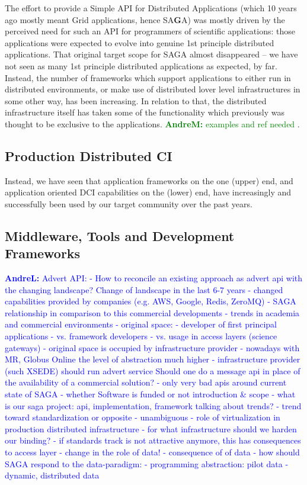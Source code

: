 \documentclass{article}
\newcommand{\B}[1]{\textbf{#1}}
\newcommand{\amnote}[1]{{\textcolor{green}{   \B{AndreM:  } #1 }}}
\newcommand{\alnote}[1]{{\textcolor{blue}{    \B{AndreL:  } #1 }}}
\newcommand{\amnote}[1]{}
\newcommand{\alnote}[1]{}
\begin{document}
  The effort to provide a Simple API for Distributed Applications
  (which 10 years ago mostly meant Grid applications, hence SA\B{G}A)
  was mostly driven by the perceived need for such an API for
  programmers of scientific applications: those applications were
  expected to evolve into genuine 1st principle distributed
  applications.  That original target scope for SAGA almost
  disappeared -- we have not seen as many 1st principle distributed
  applications as expected, by far.  Instead, the number of frameworks
  which support applications to either run in distributed
  environments, or make use of distributed lover level infrastructures
  in some other way, has been increasing.  In relation to that, the
  distributed infrastructure itself has taken some of the
  functionality which previously was thought to be exclusive to
  the applications. \amnote{examples and ref needed}.


 \subsection{Production Distributed CI}

  Instead, we have seen that application frameworks on the one (upper)
  end, and application oriented DCI capabilities on the (lower) end,
  have increasingly and successfully been used by our target community
  over the past years.


 \subsection{Middleware, Tools and Development Frameworks}


\alnote{Advert API: - How to reconcile an existing approach as advert
  api with the changing landscape?  Change of landscape in the last
  6-7 years - changed capabilities provided by companies (e.g. AWS,
  Google, Redis, ZeroMQ) - SAGA relationship in comparison to this
  commercial developments - trends in academia and commercial
  environments - original space: - developer of first principal
  applications - vs. framework developers - vs. usage in access layers
  (science gateways) - original space is occupied by infrastructure
  provider - nowadays with MR, Globus Online the level of abstraction
  much higher - infrastructure provider (such XSEDE) should run advert
  service Should one do a message api in place of the availability of
  a commercial solution?  - only very bad apis around current state of
  SAGA - whether Software is funded or not introduction \& scope -
  what is our saga project: api, implementation, framework talking
  about trends?  - trend toward standardization or opposite -
  unambiguous - role of virtualization in production distributed
  infrastructure - for what infrastructure should we harden our
  binding?  - if standards track is not attractive anymore, this has
  consequences to access layer - change in the role of data!  -
  consequence of of data - how should SAGA respond to the
  data-paradigm: - programming abstraction: pilot data - dynamic,
  distributed data }
\end{document}

